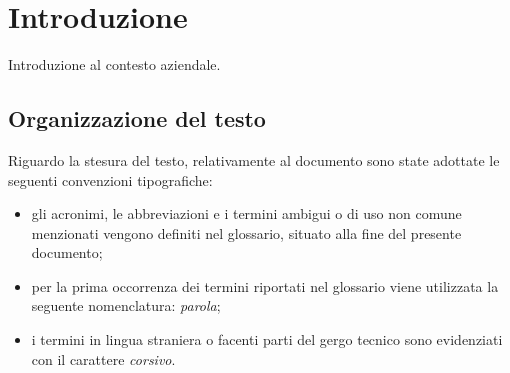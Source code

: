 \chapter{Introduzione}
\label{cap:introduzione}

Introduzione al contesto aziendale.\\





\section{Organizzazione del testo}

Riguardo la stesura del testo, relativamente al documento sono state adottate le seguenti convenzioni tipografiche:
\begin{itemize}
	\item gli acronimi, le abbreviazioni e i termini ambigui o di uso non comune menzionati vengono definiti nel glossario, situato alla fine del presente documento;
	\item per la prima occorrenza dei termini riportati nel glossario viene utilizzata la seguente nomenclatura: \emph{parola}\glsfirstoccur;
	\item i termini in lingua straniera o facenti parti del gergo tecnico sono evidenziati con il carattere \emph{corsivo}.
\end{itemize}
